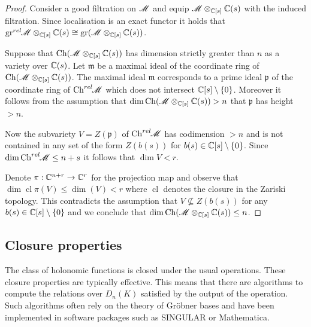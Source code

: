   \begin{proof}
    Consider a good filtration on $\mathscr{M}$ and equip $\mathscr{M}\otimes_{\mathbb{C}[s]}\mathbb{C}(s)$ with the induced filtration.
    Since localisation is an exact functor it holds that $\operatorname{gr}^{rel}\mkern-5mu\mathscr{M}\otimes_{\mathbb{C}[s]}\mathbb{C}(s) \cong \operatorname{gr}(\mathscr{M}\otimes_{\mathbb{C}[s]}\mathbb{C}(s)) $.

    Suppose that $\operatorname{Ch}(\mathscr{M}\otimes_{\mathbb{C}[s]}\mathbb{C}(s))$ has dimension strictly greater than $n$ as a variety over $\mathbb{C}(s)$.
    Let $\mathfrak{m}$ be a maximal ideal of the coordinate ring of $\operatorname{Ch} (\mathscr{M}\otimes_{\mathbb{C}[s]}\mathbb{C}(s))$.
    The maximal ideal $\mathfrak{m}$ corresponds to a prime ideal $\mathfrak{p}$ of the coordinate ring of $\operatorname{Ch}^{rel}\mkern-5mu\mathscr{M}$ which does not intersect $\mathbb{C}[s]\setminus\{0\}$.
    Moreover it follows from the assumption that  $\dim\operatorname{Ch}(\mathscr{M}\otimes_{\mathbb{C}[s]}\mathbb{C}(s))> n$ that $\mathfrak{p}$ has height $>n$.

    Now the subvariety $V = Z(\mathfrak{p})$ of $\operatorname{Ch}^{rel}\mkern-5mu\mathscr{M}$ has codimension $>n$ and is not contained in any set of the form $Z(b(s))$ for $b(s)\in \mathbb{C}[s]\setminus\{0\}$.
    Since $\dim\operatorname{Ch}^{rel}\mkern-5mu\mathscr{M}\leq n+s$ it follows that $\dim V <r$.

    Denote $\pi:\mathbb{C}^{n+r}\to\mathbb{C}^r $ for the projection map and observe that $\dim\operatorname{cl}\pi(V)\leq \dim(V) < r$ where $\operatorname{cl}$ denotes the closure in the Zariski topology. %
    This contradicts the assumption that $V\nsubseteq Z(b(s))$ for any $b(s)\in \mathbb{C}[s]\setminus\{0\}$ and we conclude that $\dim \operatorname{Ch} (\mathscr{M}\otimes_{\mathbb{C}[s]}\mathbb{C}(s)) \leq n$.
    \end{proof}
    \subsection{Closure properties}
    The class of holonomic functions is closed under the usual operations.
    These closure properties are typically effective.
    This means that there are algorithms to compute the relations over $D_n(K)$ satisfied by the output of the operation.
    Such algorithms often rely on the theory of Gr\"obner bases and have been implemented in software packages such as SINGULAR or Mathematica.


